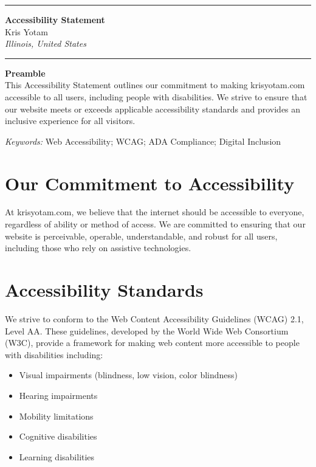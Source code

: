 \documentclass[11pt]{article}
\newcommand{\TitleLine}{\noindent\rule{\textwidth}{0.4pt}}
\begin{document}
\onehalfspacing

\vspace*{-1em}
\TitleLine
\vspace{0.5em}
\begin{center}
  {\Large\bfseries Accessibility Statement}\\[0.75em]
  {\normalsize Kris Yotam}\\
  {\itshape Illinois, United States}
\end{center}
\vspace{0.5em}
\TitleLine

\vspace{1.5em}

\noindent\textbf{Preamble}\\
This Accessibility Statement outlines our commitment to making krisyotam.com accessible to all users, including people with disabilities. We strive to ensure that our website meets or exceeds applicable accessibility standards and provides an inclusive experience for all visitors.

\vspace{0.75em}
\noindent\textit{Keywords:} Web Accessibility; WCAG; ADA Compliance; Digital Inclusion

\vspace{1.5em}

\section{Our Commitment to Accessibility}

At krisyotam.com, we believe that the internet should be accessible to everyone, regardless of ability or method of access. We are committed to ensuring that our website is perceivable, operable, understandable, and robust for all users, including those who rely on assistive technologies.

\section{Accessibility Standards}

We strive to conform to the Web Content Accessibility Guidelines (WCAG) 2.1, Level AA. These guidelines, developed by the World Wide Web Consortium (W3C), provide a framework for making web content more accessible to people with disabilities including:

\begin{itemize}
  \item Visual impairments (blindness, low vision, color blindness)
  \item Hearing impairments
  \item Mobility limitations
  \item Cognitive disabilities
  \item Learning disabilities
\end{itemize}
\end{document}
